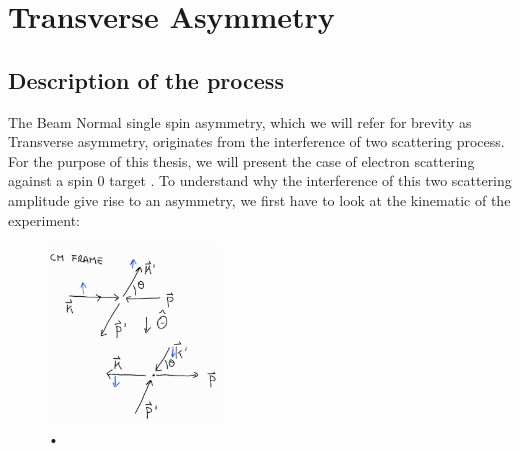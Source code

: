 
\chapter{Transverse Asymmetry} \label{transv}


\section{Description of the process}


The Beam Normal single spin asymmetry, which we will refer for brevity as Transverse asymmetry, originates from the interference of two scattering process. For the purpose of this thesis, we will present the case of electron scattering against a spin $0$ target \cite{Gorchtein_2008}.
To understand why the interference of this two scattering amplitude give rise to an asymmetry, we first have to look at the kinematic of the experiment: 

\begin{figure}[hbtp]
\centering
\includegraphics[width = 0.4\textwidth]{figures/Kinematic.jpg}
\caption{•}
\end{figure}

